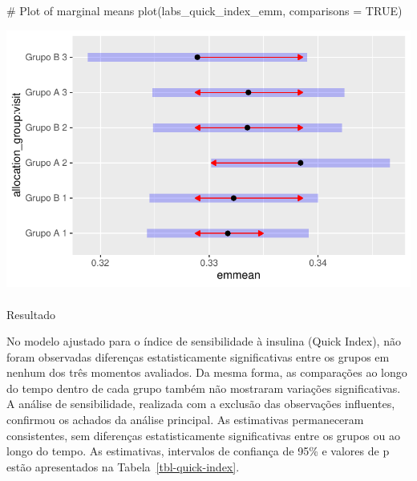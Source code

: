\documentclass[
  12pt,
]{article}
\makeatletter
\let\oldparagraph\paragraph
\renewcommand{\paragraph}{
    \@ifstar
      \xxxParagraphStar
      \xxxParagraphNoStar
  }
\newcommand{\xxxParagraphStar}[1]{\oldparagraph*{#1}\mbox{}}
\newcommand{\xxxParagraphNoStar}[1]{\oldparagraph{#1}\mbox{}}
\newenvironment{Shaded}{\begin{snugshade}}{\end{snugshade}}
\newcommand{\AttributeTok}[1]{\textcolor[rgb]{0.40,0.45,0.13}{#1}}
\newcommand{\CommentTok}[1]{\textcolor[rgb]{0.37,0.37,0.37}{#1}}
\newcommand{\ConstantTok}[1]{\textcolor[rgb]{0.56,0.35,0.01}{#1}}
\newcommand{\FunctionTok}[1]{\textcolor[rgb]{0.28,0.35,0.67}{#1}}
\newcommand{\NormalTok}[1]{\textcolor[rgb]{0.00,0.23,0.31}{#1}}
\makeatother
\begin{document}
\begin{Shaded}
\begin{Highlighting}[]
\CommentTok{\# Plot of marginal means}
\FunctionTok{plot}\NormalTok{(labs\_quick\_index\_emm, }\AttributeTok{comparisons =} \ConstantTok{TRUE}\NormalTok{)}
\end{Highlighting}
\end{Shaded}

\includegraphics{Outcomes_files/figure-pdf/labs_quick_index_sens_emm-1.pdf}

\paragraph{Resultado}\label{resultado-12}

No modelo ajustado para o índice de sensibilidade à insulina (Quick
Index), não foram observadas diferenças estatisticamente significativas
entre os grupos em nenhum dos três momentos avaliados. Da mesma forma,
as comparações ao longo do tempo dentro de cada grupo também não
mostraram variações significativas. A análise de sensibilidade,
realizada com a exclusão das observações influentes, confirmou os
achados da análise principal. As estimativas permaneceram consistentes,
sem diferenças estatisticamente significativas entre os grupos ou ao
longo do tempo. As estimativas, intervalos de confiança de 95\% e
valores de p estão apresentados na Tabela~\ref{tbl-quick-index}.
\end{document}
